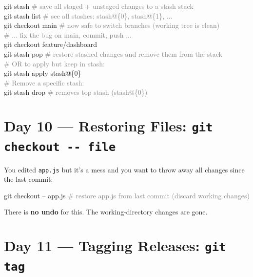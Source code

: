 \documentclass[10pt,a4paper]{article}
\newenvironment{codebox}{%
  \begin{mdframed}[backgroundcolor=codebg, linewidth=0pt,
    innerleftmargin=6pt, innerrightmargin=6pt,
    innertopmargin=4pt, innerbottommargin=4pt]%
  \small\ttfamily
}{%
  \end{mdframed}%
}
\newenvironment{warnbox}{%
  \begin{mdframed}[backgroundcolor=warnbg, linewidth=0.6pt,
    innerleftmargin=6pt, innerrightmargin=6pt,
    innertopmargin=3pt, innerbottommargin=3pt]%
  \small
}{%
  \end{mdframed}%
}
\begin{document}
\begin{codebox}
git stash               \textcolor{gray}{\# save all staged + unstaged changes to a stash stack}\\
git stash list          \textcolor{gray}{\# see all stashes: stash@\{0\}, stash@\{1\}, ...}\\
git checkout main       \textcolor{gray}{\# now safe to switch branches (working tree is clean)}\\
\textcolor{gray}{\# ... fix the bug on main, commit, push ...}\\
git checkout feature/dashboard\\
git stash pop           \textcolor{gray}{\# restore stashed changes and remove them from the stack}\\
\textcolor{gray}{\# OR to apply but keep in stash:}\\
git stash apply stash@\{0\}\\
\textcolor{gray}{\# Remove a specific stash:}\\
git stash drop          \textcolor{gray}{\# removes top stash (stash@\{0\})}
\end{codebox}

\section{Day 10 --- Restoring Files: \texttt{git checkout -{}- file}}

You edited \texttt{app.js} but it's a mess and you want to throw away all changes since the last commit:

\begin{codebox}
git checkout -- app.js      \textcolor{gray}{\# restore app.js from last commit (discard working changes)}
\end{codebox}

\begin{warnbox}
There is \textbf{no undo} for this. The working-directory changes are gone.
\end{warnbox}

\section{Day 11 --- Tagging Releases: \texttt{git tag}}
\end{document}
